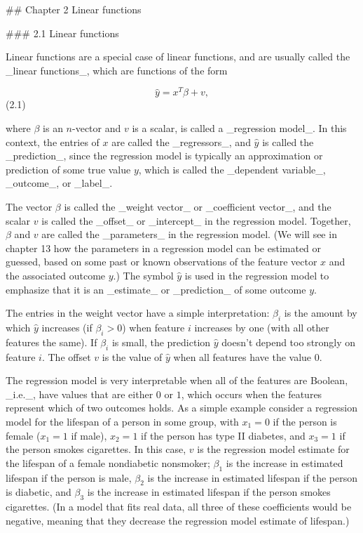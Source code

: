 

## Chapter 2 Linear functions

### 2.1 Linear functions

Linear functions are a special case of linear functions, and are usually called the _linear functions_, which are functions of the form

\[\hat{y}=x^{T}\beta+v,\] (2.1)

where \(\beta\) is an \(n\)-vector and \(v\) is a scalar, is called a _regression model_. In this context, the entries of \(x\) are called the _regressors_, and \(\hat{y}\) is called the _prediction_, since the regression model is typically an approximation or prediction of some true value \(y\), which is called the _dependent variable_, _outcome_, or _label_.

The vector \(\beta\) is called the _weight vector_ or _coefficient vector_, and the scalar \(v\) is called the _offset_ or _intercept_ in the regression model. Together, \(\beta\) and \(v\) are called the _parameters_ in the regression model. (We will see in chapter 13 how the parameters in a regression model can be estimated or guessed, based on some past or known observations of the feature vector \(x\) and the associated outcome \(y\).) The symbol \(\hat{y}\) is used in the regression model to emphasize that it is an _estimate_ or _prediction_ of some outcome \(y\).

The entries in the weight vector have a simple interpretation: \(\beta_{i}\) is the amount by which \(\hat{y}\) increases (if \(\beta_{i}>0\)) when feature \(i\) increases by one (with all other features the same). If \(\beta_{i}\) is small, the prediction \(\hat{y}\) doesn't depend too strongly on feature \(i\). The offset \(v\) is the value of \(\hat{y}\) when all features have the value \(0\).

The regression model is very interpretable when all of the features are Boolean, _i.e._, have values that are either \(0\) or \(1\), which occurs when the features represent which of two outcomes holds. As a simple example consider a regression model for the lifespan of a person in some group, with \(x_{1}=0\) if the person is female (\(x_{1}=1\) if male), \(x_{2}=1\) if the person has type II diabetes, and \(x_{3}=1\) if the person smokes cigarettes. In this case, \(v\) is the regression model estimate for the lifespan of a female nondiabetic nonsmoker; \(\beta_{1}\) is the increase in estimated lifespan if the person is male, \(\beta_{2}\) is the increase in estimated lifespan if the person is diabetic, and \(\beta_{3}\) is the increase in estimated lifespan if the person smokes cigarettes. (In a model that fits real data, all three of these coefficients would be negative, meaning that they decrease the regression model estimate of lifespan.)

